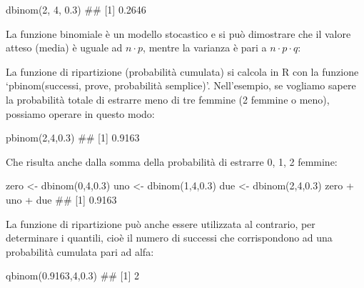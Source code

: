 \documentclass[a4paper,12pt,oneside]{book}
\newenvironment{Shaded}{}{}
\newcommand{\KeywordTok}[1]{#1}
\newcommand{\DecValTok}[1]{#1}
\newcommand{\FloatTok}[1]{#1}
\newcommand{\StringTok}[1]{#1}
\newcommand{\CommentTok}[1]{#1}
\newcommand{\OperatorTok}[1]{#1}
\newcommand{\NormalTok}[1]{#1}
\begin{document}
\begin{Shaded}
\begin{Highlighting}[]
\KeywordTok{dbinom}\NormalTok{(}\DecValTok{2}\NormalTok{, }\DecValTok{4}\NormalTok{, }\FloatTok{0.3}\NormalTok{)}
\CommentTok{## [1] 0.2646}
\end{Highlighting}
\end{Shaded}

La funzione binomiale è un modello stocastico e si può dimostrare che il valore atteso (media) è uguale ad \(n\cdot p\), mentre la varianza è pari a \(n\cdot p \cdot q\):

La funzione di ripartizione (probabilità cumulata) si calcola in R con la funzione `pbinom(successi, prove, probabilità semplice)'. Nell'esempio, se vogliamo sapere la probabilità totale di estrarre meno di tre femmine (2 femmine o meno), possiamo operare in questo modo:

\begin{Shaded}
\begin{Highlighting}[]
\KeywordTok{pbinom}\NormalTok{(}\DecValTok{2}\NormalTok{,}\DecValTok{4}\NormalTok{,}\FloatTok{0.3}\NormalTok{)}
\CommentTok{## [1] 0.9163}
\end{Highlighting}
\end{Shaded}

Che risulta anche dalla somma della probabilità di estrarre 0, 1, 2 femmine:

\begin{Shaded}
\begin{Highlighting}[]
\NormalTok{zero <-}\StringTok{ }\KeywordTok{dbinom}\NormalTok{(}\DecValTok{0}\NormalTok{,}\DecValTok{4}\NormalTok{,}\FloatTok{0.3}\NormalTok{)}
\NormalTok{uno <-}\StringTok{ }\KeywordTok{dbinom}\NormalTok{(}\DecValTok{1}\NormalTok{,}\DecValTok{4}\NormalTok{,}\FloatTok{0.3}\NormalTok{)}
\NormalTok{due <-}\StringTok{ }\KeywordTok{dbinom}\NormalTok{(}\DecValTok{2}\NormalTok{,}\DecValTok{4}\NormalTok{,}\FloatTok{0.3}\NormalTok{)}
\NormalTok{zero }\OperatorTok{+}\StringTok{ }\NormalTok{uno }\OperatorTok{+}\StringTok{ }\NormalTok{due}
\CommentTok{## [1] 0.9163}
\end{Highlighting}
\end{Shaded}

La funzione di ripartizione può anche essere utilizzata al contrario, per determinare i quantili, cioè il numero di successi che corrispondono ad una probabilità cumulata pari ad alfa:

\begin{Shaded}
\begin{Highlighting}[]
\KeywordTok{qbinom}\NormalTok{(}\FloatTok{0.9163}\NormalTok{,}\DecValTok{4}\NormalTok{,}\FloatTok{0.3}\NormalTok{)}
\CommentTok{## [1] 2}
\end{Highlighting}
\end{Shaded}
\end{document}
